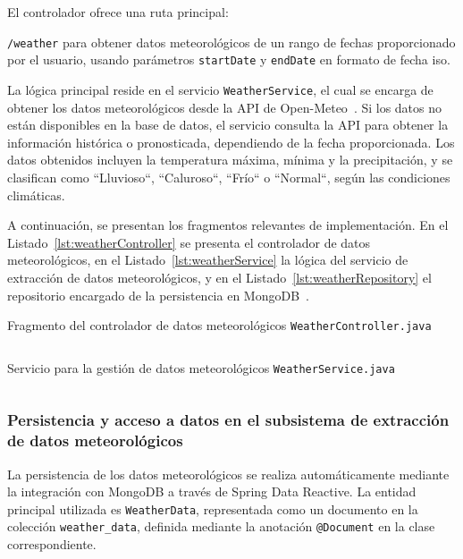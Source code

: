 El controlador ofrece una ruta principal:

\texttt{/weather} para obtener datos meteorológicos de un rango de fechas proporcionado por el usuario, usando parámetros \texttt{startDate} y \texttt{endDate} en formato de fecha \gls{iso}.

La lógica principal reside en el servicio \texttt{WeatherService}, el cual se encarga de obtener los datos meteorológicos desde la API de Open-Meteo~\cite{openmeteo:2025}. Si los datos no están disponibles en la base de datos, el servicio consulta la API para obtener la información histórica o pronosticada, dependiendo de la fecha proporcionada. Los datos obtenidos incluyen la temperatura máxima, mínima y la precipitación, y se clasifican como ``Lluvioso``, ``Caluroso``, ``Frío`` o ``Normal``, según las condiciones climáticas.

A continuación, se presentan los fragmentos relevantes de implementación. En el Listado~\ref{lst:weatherController} se presenta el controlador de datos meteorológicos, en el Listado~\ref{lst:weatherService} la lógica del servicio de extracción de datos meteorológicos, y en el Listado~\ref{lst:weatherRepository} el repositorio encargado de la persistencia en MongoDB~\cite{mongodb}.

\begin{longlisting} \caption{Fragmento del controlador de datos meteorológicos {\tt WeatherController.java}} \inputminted[firstline=15]{java}{../backend/tiempo/tiempo/src/main/java/hemal/uv/es/tiempo/controllers/WeatherController.java} \label{lst:weatherController} \end{longlisting}

\begin{longlisting} \caption{Servicio para la gestión de datos meteorológicos {\tt WeatherService.java}} \inputminted[firstline=18,fontsize=\small, breaklines, breakanywhere]{java}{../backend/tiempo/tiempo/src/main/java/hemal/uv/es/tiempo/services/WeatherService.java} \label{lst:weatherService} \end{longlisting}

\subsubsection{Persistencia y acceso a datos en el subsistema de extracción de datos meteorológicos} 

La persistencia de los datos meteorológicos se realiza automáticamente mediante la integración con MongoDB a través de Spring Data Reactive. La entidad principal utilizada es \texttt{WeatherData}, representada como un documento en la colección \texttt{weather\_data}, definida mediante la anotación \texttt{@Document} en la clase correspondiente.

